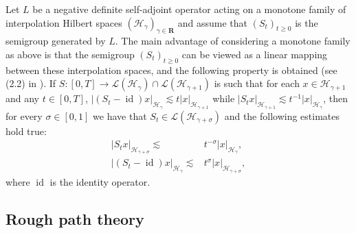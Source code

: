 \documentclass[10pt,a4paper]{article}
\numberwithin{equation}{section}
\begin{document}
Let $L $ be a negative definite self-adjoint operator acting on a monotone family of interpolation Hilbert spaces $(\mathcal{H}_{\gamma})_{\gamma \in \mathbf R}$ and assume that $(S_{t})_{t \geq 0}$ is the semigroup generated by $L$.
The main advantage of considering a monotone family as above is that the semigroup $(S_{t})_{t \geq 0}$ can be viewed as a linear mapping between these interpolation spaces,
and the following property is obtained (see (2.2) in \cite{GHN21}).
If $S: [0,T] \to \mathcal{L}(\mathcal{H}_{\gamma})\cap \mathcal{L}(\mathcal{H}_{\gamma+1})$ is such that for each $x\in\mathcal{H}_{\gamma+1}$ and any $t \in [0,T]$, $|(S_{t }-\operatorname{id})x|_{\mathcal H_\gamma} \lesssim t |x|_{\mathcal H_{\gamma+1}}$
while $|S_{t}x|_{\mathcal H_{\gamma+1}} \lesssim t^{-1}|x|_{\mathcal H_\gamma}$,
then for every $\sigma\in[0,1]$ we have that $S_{t} \in \mathcal{L}(\mathcal{H}_{\gamma+\sigma})$ and the following estimates hold true:
\begin{align}
	|S_{t} x |_{\mathcal H_{\gamma+\sigma}} \lesssim & t^{-\sigma} |x|_{\mathcal H_\gamma}, \label{group1} \\
	|(S_{t}-\operatorname{id} ) x |_{\mathcal H_\gamma} \lesssim & t^\sigma |x|_{\mathcal H_{\gamma+\sigma}}, \label{group2}
\end{align}
where $\operatorname{id}$ is the identity operator.













\subsection{Rough path theory}
\end{document}

